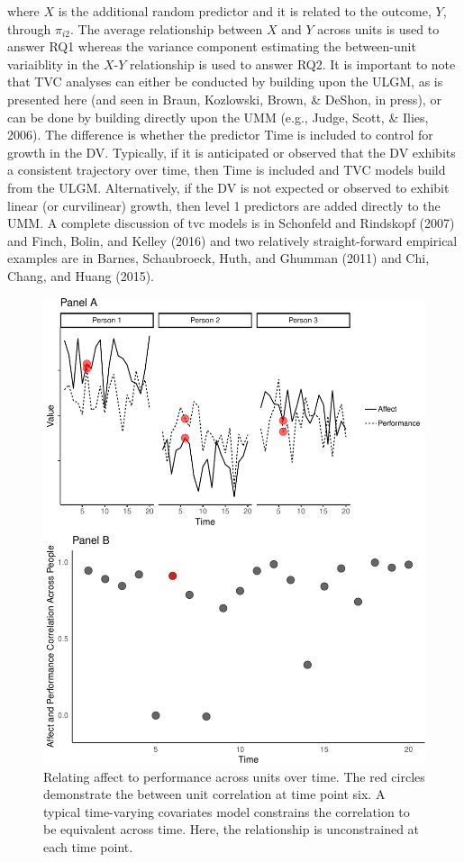 \documentclass[english,,man]{apa6}
\theoremstyle{definition}
\theoremstyle{definition}
\theoremstyle{definition}
\theoremstyle{remark}
\begin{document}
\noindent \noindent where \(X\) is the additional random predictor and
it is related to the outcome, \(Y\), through \(\pi_{i2}\). The average
relationship between \(X\) and \(Y\) across units is used to answer RQ1
whereas the variance component estimating the between-unit variaiblity
in the \(X\)-\(Y\) relationship is used to answer RQ2. It is important
to note that TVC analyses can either be conducted by building upon the
ULGM, as is presented here (and seen in Braun, Kozlowski, Brown, \&
DeShon, in press), or can be done by building directly upon the UMM
(e.g., Judge, Scott, \& Ilies, 2006). The difference is whether the
predictor Time is included to control for growth in the DV. Typically,
if it is anticipated or observed that the DV exhibits a consistent
trajectory over time, then Time is included and TVC models build from
the ULGM. Alternatively, if the DV is not expected or observed to
exhibit linear (or curvilinear) growth, then level 1 predictors are
added directly to the UMM. A complete discussion of tvc models is in
Schonfeld and Rindskopf (2007) and Finch, Bolin, and Kelley (2016) and
two relatively straight-forward empirical examples are in Barnes,
Schaubroeck, Huth, and Ghumman (2011) and Chi, Chang, and Huang (2015).

\begin{figure}
\centering
\includegraphics{figures/unnamed-chunk-14-1.pdf}
\caption{\label{fig:unnamed-chunk-14}Relating affect to performance across
units over time. The red circles demonstrate the between unit
correlation at time point six. A typical time-varying covariates model
constrains the correlation to be equivalent across time. Here, the
relationship is unconstrained at each time point.\label{relation_tvc}}
\end{figure}
\end{document}

